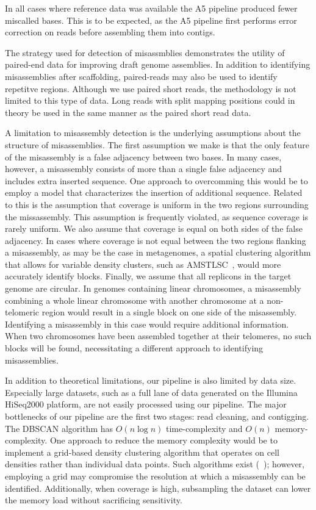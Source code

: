 \documentclass{bioinfo}
\begin{document}
In all cases where reference data was available the A5 pipeline produced fewer miscalled bases. This is to
be expected, as the A5 pipeline first performs error correction on reads before assembling them into contigs.

The strategy used for detection of misassmblies demonstrates the utility of paired-end data for improving draft genome assemblies.
In addition to identifying misassemblies after scaffolding, paired-reads may also be used to identify repetitve regions.   
Although we use paired short reads, the methodology is not limited to this type of data. Long reads with split mapping positions 
could in theory be used in the same manner as the paired short read data.

A limitation to misassembly detection is the underlying assumptions about the structure of misassemblies. The first assumption we make
is that the only feature of the misassembly is a false adjacency between two bases.
In many cases, however, a misassembly consists of more than a single false adjacency and includes extra inserted sequence.  One approach to
overcomming this would be to employ a model that characterizes the insertion of additional sequence. Related to this is the assumption 
that coverage is uniform in the two regions surrounding the missassembly. This assumption is frequently violated, as sequence coverage
is rarely uniform. We also assume that coverage is equal on both sides of the false adjacency. In cases where coverage is not equal between 
the two regions flanking a misassembly, as may be the case in metagenomes, a spatial clustering algorithm that allows for variable density
clusters, such as AMSTLSC~\citep{AMSTLSC}, would more accurately identify blocks. Finally, we assume that all replicons in the target genome
are circular. In genomes containing linear chromosomes, a misassembly combining a whole linear chromosome with another chromosome
at a non-telomeric region would result in a single block on one side of the misassembly. Identifying a misassembly in this case
would require additional information. When two chromosomes have been assembled together at their telomeres, no such blocks will be found, 
necessitating a different approach to identifying misassemblies.

In addition to theoretical limitations, our pipeline is also limited by data size. Especially large datasets, such as a full lane of data
generated on the Illumina HiSeq2000 platform, are not easily processed using our pipeline. The major bottlenecks of our pipeline are the 
first two stages: read cleaning, and contigging. The DBSCAN algorithm has $O(n\log{n})$ time-complexity and $O(n)$ memory-complexity. One 
approach to reduce the memory complexity would be to implement a grid-based density clustering algorithm that operates on cell densities 
rather than individual data points. Such algorithms exist (~\citep{STING}); however, employing a grid may compromise the resolution at which 
a misassembly can be identified. Additionally, when coverage is high, subsampling the dataset can lower the memory load without sacrificing
sensitivity.
\end{document}
